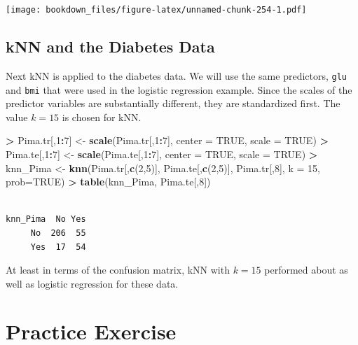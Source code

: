 \documentclass[]{krantz}
\makeatletter
\newenvironment{Shaded}{\begin{snugshade}}{\end{snugshade}}
\newcommand{\KeywordTok}[1]{\textcolor[rgb]{0.27,0.27,0.27}{\textbf{#1}}}
\newcommand{\DataTypeTok}[1]{\textcolor[rgb]{0.27,0.27,0.27}{#1}}
\newcommand{\DecValTok}[1]{\textcolor[rgb]{0.06,0.06,0.06}{#1}}
\newcommand{\StringTok}[1]{\textcolor[rgb]{0.5,0.5,0.5}{#1}}
\newcommand{\OtherTok}[1]{\textcolor[rgb]{0.37,0.37,0.37}{#1}}
\newcommand{\OperatorTok}[1]{\textcolor[rgb]{0.43,0.43,0.43}{\textbf{#1}}}
\newcommand{\NormalTok}[1]{#1}
\newenvironment{kframe}{%
\medskip{}
\setlength{\fboxsep}{.8em}
 \def\at@end@of@kframe{}%
 \ifinner\ifhmode%
  \def\at@end@of@kframe{\end{minipage}}%
  \begin{minipage}{\columnwidth}%
 \fi\fi%
 \def\FrameCommand##1{\hskip\@totalleftmargin \hskip-\fboxsep
 \colorbox{shadecolor}{##1}\hskip-\fboxsep
     \hskip-\linewidth \hskip-\@totalleftmargin \hskip\columnwidth}%
 \MakeFramed {\advance\hsize-\width
   \@totalleftmargin\z@ \linewidth\hsize
   \@setminipage}}%
 {\par\unskip\endMakeFramed%
 \at@end@of@kframe}
\renewenvironment{Shaded}{\begin{kframe}}{\end{kframe}}
\makeatother
\begin{document}
\texttt{[image: bookdown\_files/figure-latex/unnamed-chunk-254-1.pdf]}

\subsection{kNN and the Diabetes Data}\label{knn-and-the-diabetes-data}

Next kNN is applied to the diabetes data. We will use the same
predictors, \texttt{glu} and \texttt{bmi} that were used in the logistic
regression example. Since the scales of the predictor variables are
substantially different, they are standardized first. The value \(k=15\)
is chosen for kNN.

\begin{Shaded}
\begin{Highlighting}[]
\OperatorTok{>}\StringTok{ }\NormalTok{Pima.tr[,}\DecValTok{1}\OperatorTok{:}\DecValTok{7}\NormalTok{] <-}\StringTok{ }\KeywordTok{scale}\NormalTok{(Pima.tr[,}\DecValTok{1}\OperatorTok{:}\DecValTok{7}\NormalTok{], }\DataTypeTok{center =} \OtherTok{TRUE}\NormalTok{, }\DataTypeTok{scale =} \OtherTok{TRUE}\NormalTok{)}
\OperatorTok{>}\StringTok{ }\NormalTok{Pima.te[,}\DecValTok{1}\OperatorTok{:}\DecValTok{7}\NormalTok{] <-}\StringTok{ }\KeywordTok{scale}\NormalTok{(Pima.te[,}\DecValTok{1}\OperatorTok{:}\DecValTok{7}\NormalTok{], }\DataTypeTok{center =} \OtherTok{TRUE}\NormalTok{, }\DataTypeTok{scale =} \OtherTok{TRUE}\NormalTok{)}
\OperatorTok{>}\StringTok{ }\NormalTok{knn_Pima <-}\StringTok{ }\KeywordTok{knn}\NormalTok{(Pima.tr[,}\KeywordTok{c}\NormalTok{(}\DecValTok{2}\NormalTok{,}\DecValTok{5}\NormalTok{)], Pima.te[,}\KeywordTok{c}\NormalTok{(}\DecValTok{2}\NormalTok{,}\DecValTok{5}\NormalTok{)], Pima.tr[,}\DecValTok{8}\NormalTok{], }\DataTypeTok{k =} \DecValTok{15}\NormalTok{, }\DataTypeTok{prob=}\OtherTok{TRUE}\NormalTok{)}
\OperatorTok{>}\StringTok{ }\KeywordTok{table}\NormalTok{(knn_Pima, Pima.te[,}\DecValTok{8}\NormalTok{])}
\end{Highlighting}
\end{Shaded}

\begin{verbatim}
        
knn_Pima  No Yes
     No  206  55
     Yes  17  54
\end{verbatim}

At least in terms of the confusion matrix, kNN with \(k=15\) performed
about as well as logistic regression for these data.

\section{Practice Exercise}\label{practice-exercise-13}
\end{document}
